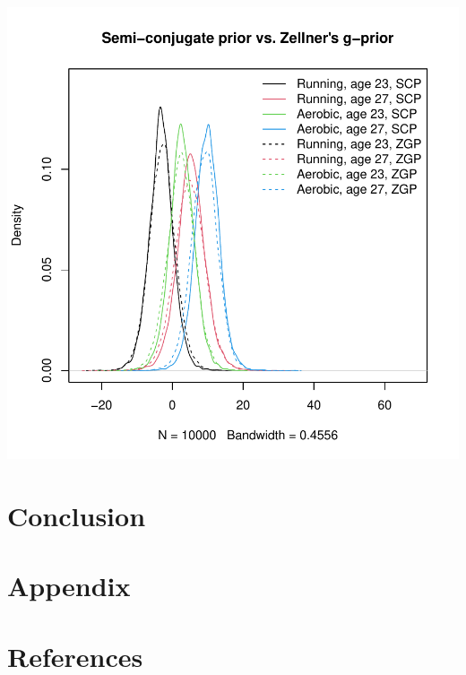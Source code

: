 \documentclass[12pt, a4paper]{article}
\begin{document}
\includegraphics{Thesis_v4-016}


\clearpage

\section{Conclusion}

\section{Appendix}

\section{References}
\end{document}

